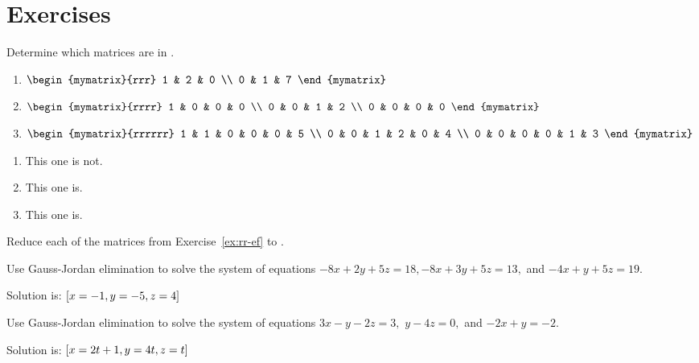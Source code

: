 \section*{Exercises}

\begin{enumialphparenastyle}

\begin{ex} Determine which matrices are in {\rref}. 

\begin{enumerate}
\item $\begin{mymatrix}{rrr}
1 & 2 & 0 \\
0 & 1 & 7
\end{mymatrix} $

\item $\begin{mymatrix}{rrrr}
1 & 0 & 0 & 0 \\
0 & 0 & 1 & 2 \\
0 & 0 & 0 & 0
\end{mymatrix} $

\item $\begin{mymatrix}{rrrrrr}
1 & 1 & 0 & 0 & 0 & 5 \\
0 & 0 & 1 & 2 & 0 & 4 \\
0 & 0 & 0 & 0 & 1 & 3
\end{mymatrix} $
\end{enumerate}
\begin{sol}
\begin{enumerate}
\item This one is not.
\item This one is.
\item This one is.
\end{enumerate}
\end{sol}
\end{ex}

\begin{ex}
 Reduce each of the matrices from Exercise~\ref{ex:rr-ef} to {\rref}.
\end{ex}

\begin{ex} Use Gauss-Jordan elimination to solve the system of equations
$-8x+2y+5z=18,-8x+3y+5z=13,$ and $-4x+y+5z=19.$
\begin{sol}
 Solution is: $\left[x=-1,y=-5,z=4\right] $
\end{sol}
\end{ex}

\begin{ex} Use Gauss-Jordan elimination to solve the system of equations $3x-y-2z=3,$ 
$y-4z=0,$ and $-2x+y=-2.$
\begin{sol}
Solution is: $\left[x=2t+1,y=4t,z=t\right] $
\end{sol}
\end{ex}


\end{enumialphparenastyle}

